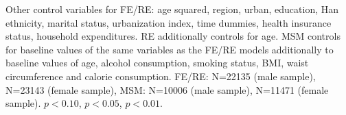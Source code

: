 \begin{table}[!ht]
\begin{adjustbox}{max width=\linewidth, center}
\begin{threeparttable}
{\begin{tablenotes}
Other control variables for FE/RE: age squared, region, urban, education, Han ethnicity, marital status, urbanization index, time dummies, health insurance status, household expenditures. RE additionally controls for age. MSM controls for baseline values of the same variables as the FE/RE models additionally to baseline values of age, alcohol consumption, smoking status, BMI, waist circumference and calorie consumption. FE/RE:  N=22135 (male sample), N=23143 (female sample), MSM: N=10006 (male sample), N=11471 (female sample). \sym{*} \(p<0.10\), \sym{**} \(p<0.05\), \sym{***} \(p<0.01\).
\end{tablenotes}
}
\end{threeparttable}
\end{adjustbox}
\end{table}

\clearpage

